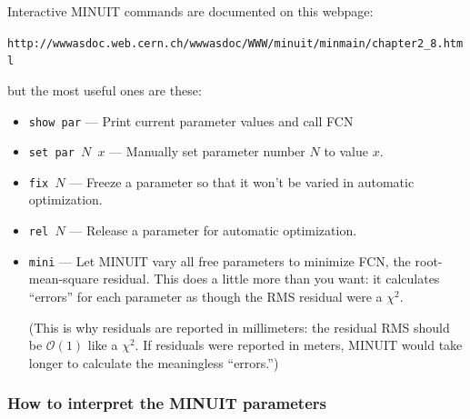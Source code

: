 \documentclass[12pt]{article}
\begin{document}
Interactive MINUIT commands are documented on this webpage:
\begin{center}
\tt http://wwwasdoc.web.cern.ch/wwwasdoc/WWW/minuit/minmain/chapter2\_8.html
\end{center}
but the most useful ones are these:
\begin{itemize}

  \item {\tt show par} --- Print current parameter values and call FCN

  \item {\tt set par $N$ $x$} --- Manually set parameter number $N$ to
  value $x$.

  \item {\tt fix $N$} --- Freeze a parameter so that it won't be
  varied in automatic optimization.

  \item {\tt rel $N$} --- Release a parameter for automatic
  optimization.

  \item {\tt mini} --- Let MINUIT vary all free parameters to minimize
  FCN, the root-mean-square residual.  This does a little more than
  you want: it calculates ``errors'' for each parameter as though the
  RMS residual were a $\chi^2$.

  (This is why residuals are reported in millimeters: the residual RMS
  should be $\mathcal{O}(1)$ like a $\chi^2$.  If residuals were
  reported in meters, MINUIT would take longer to calculate the
  meaningless ``errors.'')

\end{itemize}

\subsubsection{How to interpret the MINUIT parameters}
\end{document}
